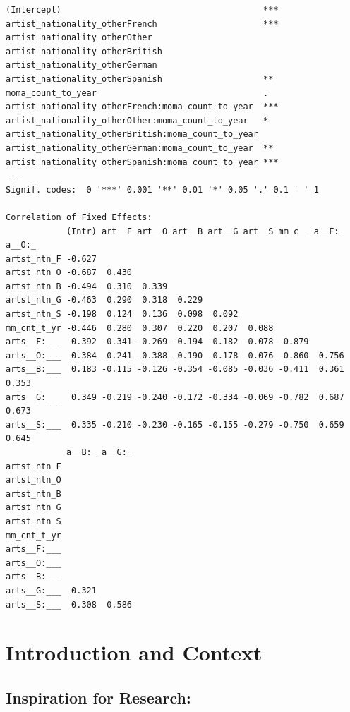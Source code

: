 \documentclass[
  letterpaper,
  DIV=11,
  numbers=noendperiod]{scrreprt}
\begin{document}
\begin{verbatim}
(Intercept)                                        ***
artist_nationality_otherFrench                     ***
artist_nationality_otherOther                         
artist_nationality_otherBritish                       
artist_nationality_otherGerman                        
artist_nationality_otherSpanish                    ** 
moma_count_to_year                                 .  
artist_nationality_otherFrench:moma_count_to_year  ***
artist_nationality_otherOther:moma_count_to_year   *  
artist_nationality_otherBritish:moma_count_to_year    
artist_nationality_otherGerman:moma_count_to_year  ** 
artist_nationality_otherSpanish:moma_count_to_year ***
---
Signif. codes:  0 '***' 0.001 '**' 0.01 '*' 0.05 '.' 0.1 ' ' 1

Correlation of Fixed Effects:
            (Intr) art__F art__O art__B art__G art__S mm_c__ a__F:_ a__O:_
artst_ntn_F -0.627                                                        
artst_ntn_O -0.687  0.430                                                 
artst_ntn_B -0.494  0.310  0.339                                          
artst_ntn_G -0.463  0.290  0.318  0.229                                   
artst_ntn_S -0.198  0.124  0.136  0.098  0.092                            
mm_cnt_t_yr -0.446  0.280  0.307  0.220  0.207  0.088                     
arts__F:___  0.392 -0.341 -0.269 -0.194 -0.182 -0.078 -0.879              
arts__O:___  0.384 -0.241 -0.388 -0.190 -0.178 -0.076 -0.860  0.756       
arts__B:___  0.183 -0.115 -0.126 -0.354 -0.085 -0.036 -0.411  0.361  0.353
arts__G:___  0.349 -0.219 -0.240 -0.172 -0.334 -0.069 -0.782  0.687  0.673
arts__S:___  0.335 -0.210 -0.230 -0.165 -0.155 -0.279 -0.750  0.659  0.645
            a__B:_ a__G:_
artst_ntn_F              
artst_ntn_O              
artst_ntn_B              
artst_ntn_G              
artst_ntn_S              
mm_cnt_t_yr              
arts__F:___              
arts__O:___              
arts__B:___              
arts__G:___  0.321       
arts__S:___  0.308  0.586
\end{verbatim}

\hypertarget{introduction-and-context}{%
\chapter{Introduction and Context}\label{introduction-and-context}}

\hypertarget{inspiration-for-research}{%
\section{Inspiration for Research:}\label{inspiration-for-research}}
\end{document}
